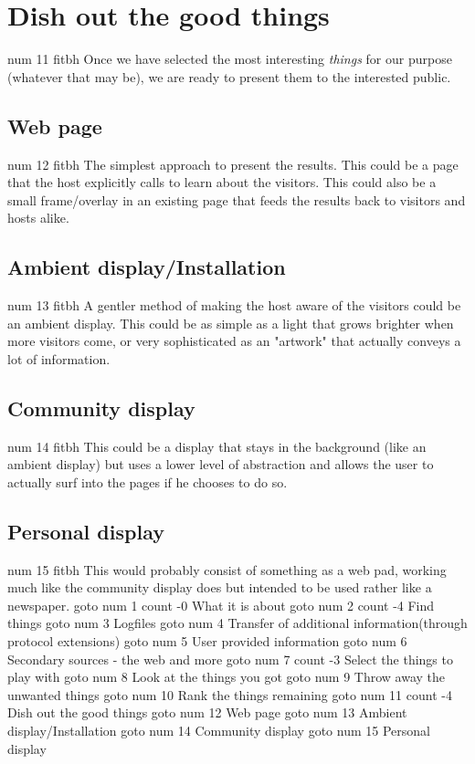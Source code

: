 \documentclass[a4paper]{danarticle}
\begin{document}
  \section*{Dish out the good things}
\pdfdest num 11 fitbh
    Once we have selected the most interesting \textit{things} for our 
    purpose (whatever
    that may be), we are ready to present them to the interested public.
    \subsection*{Web page}
\pdfdest num 12 fitbh
      The simplest approach to present the results. This could be a page that
      the host explicitly calls to learn about the visitors. This could also be
      a small frame/overlay in an existing page that feeds the results back to
      visitors and hosts alike.
    \subsection*{Ambient display/Installation}
\pdfdest num 13 fitbh
      A gentler method of making the host aware of the visitors could be an
      ambient display. This could be as simple as a light that grows brighter
      when more visitors come, or very sophisticated as an "artwork" that
      actually conveys a lot of information.
    \subsection*{Community display}
\pdfdest num 14 fitbh
      This could be a display that stays in the background (like an ambient
      display) but uses a lower level of abstraction and allows the user to
      actually surf into the pages if he chooses to do so.
    \subsection*{Personal display}
\pdfdest num 15 fitbh
      This would probably consist of something as a web pad, working much like
      the community display does but intended to be used rather like a
      newspaper.
\pdfoutline goto num 1 count -0 {What it is about}
\pdfoutline goto num 2 count -4 {Find things}
\pdfoutline goto num 3 {Logfiles}
\pdfoutline goto num 4 {Transfer of additional information(through protocol extensions)}
\pdfoutline goto num 5 {User provided information}
\pdfoutline goto num 6 {Secondary sources - the web and more}
\pdfoutline goto num 7 count -3 {Select the things to play with}
\pdfoutline goto num 8 {Look at the things you got}
\pdfoutline goto num 9 {Throw away the unwanted things}
\pdfoutline goto num 10 {Rank the things remaining}
\pdfoutline goto num 11 count -4 {Dish out the good things}
\pdfoutline goto num 12 {Web page}
\pdfoutline goto num 13 {Ambient display/Installation}
\pdfoutline goto num 14 {Community display}
\pdfoutline goto num 15 {Personal display}

\end{document}
